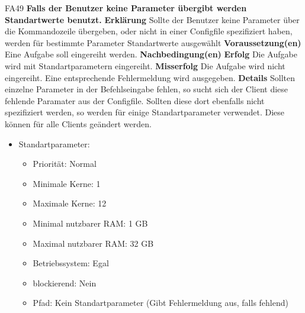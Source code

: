 \documentclass[a4paper,12pt]{article}
\begin{document}
\begin{itemize}[nosep]
	\begin{minipage}[t]{\linewidth}
		\item[FA49] \textbf{Falls der \gls{Benutzer} keine Parameter übergibt werden Standartwerte benutzt.}
		\subitem \textbf{Erklärung} Sollte der \gls{Benutzer} keine Parameter über die Kommandozeile übergeben, oder nicht in einer Configfile spezifiziert haben, werden für bestimmte Parameter Standartwerte ausgewählt
		\subitem \textbf{Voraussetzung(en)} Eine Aufgabe soll eingereiht werden.
		\subitem \textbf{Nachbedingung(en)}
		\subsubitem \textbf{Erfolg} Die Aufgabe wird mit Standartparametern eingereiht.
		\subsubitem \textbf{Misserfolg} Die Aufgabe wird nicht eingereiht. Eine entsprechende Fehlermeldung wird ausgegeben.
		\subitem \textbf{Details} Sollten einzelne Parameter in der Befehlseingabe fehlen, so sucht sich der \gls{Client} diese fehlende Paramater aus der Configfile. Sollten diese dort ebenfalls nicht spezifiziert werden, so werden für einige Standartparameter verwendet.
		Diese können für alle \glspl{Client} geändert werden.
		\begin{itemize}[nosep,label={}]
			\item Standartparameter:
	    \begin{itemize}[nosep]
			\item Priorität: Normal
			\item Minimale Kerne: 1
			\item Maximale Kerne: 12
			\item Minimal nutzbarer RAM: 1 GB
			\item Maximal nutzbarer RAM: 32 GB
			\item Betriebssystem: Egal
			\item blockierend: Nein
			\item Pfad: Kein Standartparameter (Gibt Fehlermeldung aus, falls fehlend)
		\end{itemize}
	\end{itemize}
	\end{minipage}
	\newline
	\\
	

\end{itemize}
\end{document}

